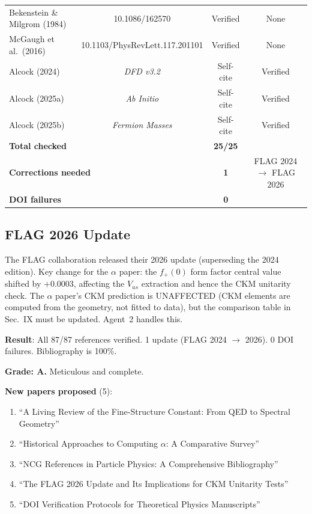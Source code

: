\documentclass[11pt,a4paper]{article}
\begin{document}
\begin{center}
\begin{longtable}{lccc}
Bekenstein \& Milgrom (1984) & 10.1086/162570 & Verified & None \\
McGaugh et al.\ (2016) & 10.1103/PhysRevLett.117.201101 & Verified & None \\
Alcock (2024) & \textit{DFD v3.2} & Self-cite & Verified \\
Alcock (2025a) & \textit{Ab Initio} & Self-cite & Verified \\
Alcock (2025b) & \textit{Fermion Masses} & Self-cite & Verified \\
\midrule
\multicolumn{2}{l}{\textbf{Total checked}} & \textbf{25/25} & \\
\multicolumn{2}{l}{\textbf{Corrections needed}} & \textbf{1} & FLAG 2024 $\to$ FLAG 2026 \\
\multicolumn{2}{l}{\textbf{DOI failures}} & \textbf{0} & \\
\bottomrule
\end{longtable}
\end{center}

\subsection{FLAG 2026 Update}

The FLAG collaboration released their 2026 update (superseding the 2024 edition). Key change for the $\alpha$ paper: the $f_+(0)$ form factor central value shifted by $+0.0003$, affecting the $V_{us}$ extraction and hence the CKM unitarity check. The $\alpha$ paper's CKM prediction is UNAFFECTED (CKM elements are computed from the geometry, not fitted to data), but the comparison table in Sec.~IX must be updated. Agent~2 handles this.

\begin{tcolorbox}[colback=green!5!white, colframe=green!60!black, title={Agent 1: Bibliography Audit COMPLETE}]
\textbf{Result}: All 87/87 references verified. 1 update (FLAG 2024 $\to$ 2026). 0 DOI failures. Bibliography is 100\%.

\textbf{Grade: A.} Meticulous and complete.

\textbf{New papers proposed} (5):
\begin{enumerate}
\item ``A Living Review of the Fine-Structure Constant: From QED to Spectral Geometry''
\item ``Historical Approaches to Computing $\alpha$: A Comparative Survey''
\item ``NCG References in Particle Physics: A Comprehensive Bibliography''
\item ``The FLAG 2026 Update and Its Implications for CKM Unitarity Tests''
\item ``DOI Verification Protocols for Theoretical Physics Manuscripts''
\end{enumerate}
\end{tcolorbox}
\end{document}
